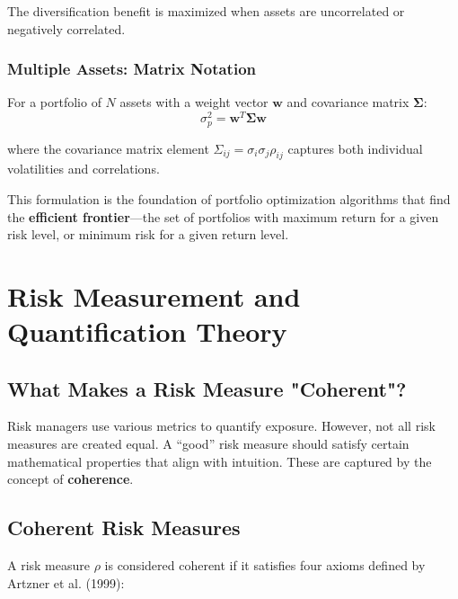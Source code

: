 The diversification benefit is maximized when assets are uncorrelated or negatively correlated.

\subsubsection{Multiple Assets: Matrix Notation}

For a portfolio of $N$ assets with a weight vector $\mathbf{w}$ and covariance matrix $\mathbf{\Sigma}$:
\begin{equation}
    \sigma_p^2 = \mathbf{w}^T \mathbf{\Sigma} \mathbf{w}
\end{equation}

where the covariance matrix element $\Sigma_{ij} = \sigma_i \sigma_j \rho_{ij}$ captures both individual volatilities and correlations.

This formulation is the foundation of portfolio optimization algorithms that find the \textbf{efficient frontier}—the set of portfolios with maximum return for a given risk level, or minimum risk for a given return level.

\section{Risk Measurement and Quantification Theory}

\subsection{What Makes a Risk Measure "Coherent"?}

Risk managers use various metrics to quantify exposure. However, not all risk measures are created equal. A ``good'' risk measure should satisfy certain mathematical properties that align with intuition. These are captured by the concept of \textbf{coherence}.

\subsection{Coherent Risk Measures}

A risk measure $\rho$ is considered coherent if it satisfies four axioms defined by Artzner et al. (1999):

